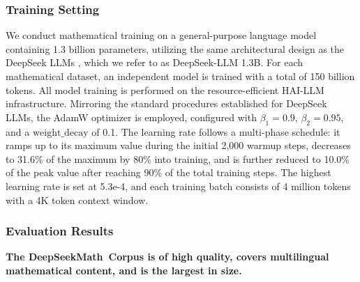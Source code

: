 \begin{itemize}[topsep=0pt]
\begin{itemize}[topsep=0pt]
\subsubsection{Training Setting}
\label{sec:quality-policy}
We conduct mathematical training on a general-purpose language model containing 1.3 billion parameters, utilizing the same architectural design as the DeepSeek LLMs \citep{deepseek-llm}, which we refer to as DeepSeek-LLM 1.3B. For each mathematical dataset, an independent model is trained with a total of 150 billion tokens. All model training is performed on the resource-efficient HAI-LLM \citep{haillm} infrastructure. Mirroring the standard procedures established for DeepSeek LLMs, the AdamW optimizer \citep{adamW} is employed, configured with $\beta_1=0.9$, $\beta_2=0.95$, and a $\mathrm{weight\_decay}$ of 0.1. The learning rate follows a multi-phase schedule: it ramps up to its maximum value during the initial 2,000 warmup steps, decreases to 31.6\% of the maximum by 80\% into training, and is further reduced to 10.0\% of the peak value after reaching 90\% of the total training steps. The highest learning rate is set at 5.3e-4, and each training batch consists of 4 million tokens with a 4K token context window.

\subsubsection{Evaluation Results}

\textbf{The DeepSeekMath~Corpus is of high quality, covers multilingual mathematical content, and is the largest in size.}


\end{itemize}
\end{itemize}
